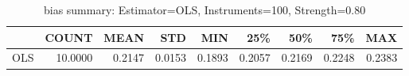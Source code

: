 \begin{table}[ht]
\centering
\caption{bias summary: Estimator=OLS, Instruments=100, Strength=0.80}
\begin{tabular}{lrrrrrrrr}
\toprule
 & COUNT & MEAN & STD & MIN & 25\% & 50\% & 75\% & MAX \\
\midrule
OLS & 10.0000 & 0.2147 & 0.0153 & 0.1893 & 0.2057 & 0.2169 & 0.2248 & 0.2383 \\
\bottomrule
\end{tabular}
\end{table}
